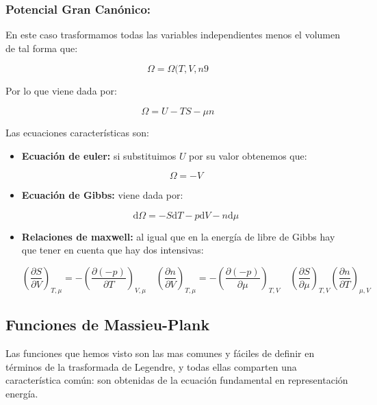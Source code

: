 \documentclass[12pt,a4paper]{article}
\newcommand{\D}{\mathrm{d}}
\newcommand{\parentesis}[1]{\left( #1 \right)}
\newcommand{\parciales}[2]{\frac{\partial #1}{\partial #2}}
\begin{document}
\subsubsection{Potencial Gran Canónico:}

En este caso trasformamos todas las variables independientes menos el volumen de tal forma que:

\begin{equation}
\Omega =  \Omega (T,V,n9
\end{equation}

Por lo que viene dada por:

\begin{equation}
\Omega = U - T S - \mu n
\end{equation}

Las ecuaciones características son:

\begin{itemize}
\item \textbf{Ecuación de euler:} si substituimos $U$ por su valor obtenemos que:

\begin{equation}
\Omega = - V
\end{equation}

\item \textbf{Ecuación de Gibbs:} viene dada por:

\begin{equation}
\D \Omega = - S \D T -p \D V - n \D \mu
\end{equation}

\item \textbf{Relaciones de maxwell:} al igual que en la energía de libre de Gibbs hay que tener en cuenta que hay dos intensivas:

\begin{equation}
\parentesis{\parciales{S}{V}}_{T,\mu} = - \parentesis{\parciales{(-p)}{T}}_{V,\mu} \quad \parentesis{\parciales{n}{V}}_{T, \mu} = - \parentesis{\parciales{(-p)}{\mu}}_{T, V} \quad \parentesis{\parciales{S}{\mu}}_{T,V}  \parentesis{\parciales{n}{T}}_{\mu, V}
\end{equation}


\end{itemize}


\subsection{Funciones de Massieu-Plank}

Las funciones que hemos visto son las mas comunes y fáciles de definir en términos de la trasformada de Legendre, y todas ellas comparten una característica común: son obtenidas de la ecuación fundamental en representación energía. \\
\end{document}
